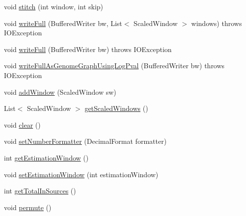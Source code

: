 \begin{DoxyCompactItemize}
\item 
void \hyperlink{classbroad_1_1core_1_1siphy_1_1_tree_scaler_i_o_a69c1081293f24829302b33be5b1faebf}{stitch} (int window, int skip)
\item 
void \hyperlink{classbroad_1_1core_1_1siphy_1_1_tree_scaler_i_o_a7e8e076a48575ca01907a521c79f5335}{write\+Full} (Buffered\+Writer bw, List$<$ Scaled\+Window $>$ windows)  throws I\+O\+Exception 
\item 
void \hyperlink{classbroad_1_1core_1_1siphy_1_1_tree_scaler_i_o_a9a75d512256e6ad3771d8a3915bb1ea9}{write\+Full} (Buffered\+Writer bw)  throws I\+O\+Exception
\item 
void \hyperlink{classbroad_1_1core_1_1siphy_1_1_tree_scaler_i_o_ade214870049a862809df1c6d841679c4}{write\+Full\+As\+Genome\+Graph\+Using\+Log\+Pval} (Buffered\+Writer bw)  throws I\+O\+Exception 
\item 
void \hyperlink{classbroad_1_1core_1_1siphy_1_1_tree_scaler_i_o_a0cf0dc8f9239a45e7c6dd7c876a7e91c}{add\+Window} (Scaled\+Window sw)
\item 
List$<$ Scaled\+Window $>$ \hyperlink{classbroad_1_1core_1_1siphy_1_1_tree_scaler_i_o_ab1c676fec1471f7b23d7d1d5199a3878}{get\+Scaled\+Windows} ()
\item 
void \hyperlink{classbroad_1_1core_1_1siphy_1_1_tree_scaler_i_o_ac47c876b37855beabcb882191a1b3796}{clear} ()
\item 
void \hyperlink{classbroad_1_1core_1_1siphy_1_1_tree_scaler_i_o_a1877b909d6db65af1d83df131eb88187}{set\+Number\+Formatter} (Decimal\+Format formatter)
\item 
int \hyperlink{classbroad_1_1core_1_1siphy_1_1_tree_scaler_i_o_ab8e19762981c09c8139d16b5e6e9e752}{get\+Estimation\+Window} ()
\item 
void \hyperlink{classbroad_1_1core_1_1siphy_1_1_tree_scaler_i_o_af3004c6b98503e588a3ebde5820245f9}{set\+Estimation\+Window} (int estimation\+Window)
\item 
int \hyperlink{classbroad_1_1core_1_1siphy_1_1_tree_scaler_i_o_a166843bedad99e2fba9d6390a1abd79a}{get\+Total\+In\+Sources} ()
\item 
void \hyperlink{classbroad_1_1core_1_1siphy_1_1_tree_scaler_i_o_abe1883c44adf13c59fd77ca473e07e66}{permute} ()
\end{DoxyCompactItemize}


